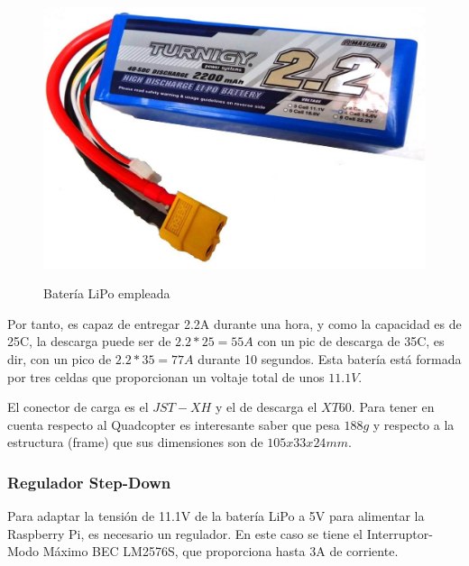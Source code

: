 \documentclass[twoside,11pt]{book}
\begin{document}
\begin{figure}[h!]
\begin{center}
\includegraphics[scale=0.09,bb=0 0 1433 979]{images/LiPo.png} \\
\caption{Batería LiPo empleada}
\end{center}
\end{figure}


Por tanto, es capaz de entregar 2.2A durante una hora, y como la capacidad es de 25C, la descarga puede ser de $2.2*25=55A$ con un pic de descarga de 35C, es dir, con un pico de $2.2*35=77A$ durante 10 segundos. Esta batería está formada por tres celdas que proporcionan un voltaje total de unos $11.1V$.

El conector de carga es el $JST-XH$ y el de descarga el $XT60$. Para tener en cuenta respecto al Quadcopter es interesante saber que pesa $188g$ y respecto a la estructura (frame) que sus dimensiones son de $105x33x24mm$.

\subsubsection*{Regulador Step-Down}
Para adaptar la tensión de 11.1V de la batería LiPo a 5V para alimentar la Raspberry Pi, es necesario un regulador. En este caso se tiene el Interruptor-Modo Máximo BEC LM2576S, que proporciona hasta 3A de corriente.

\end{document}
